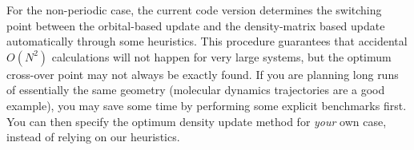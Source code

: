 For the non-periodic case, the current code version determines the
switching point between the orbital-based update and the
density-matrix based update automatically through some
heuristics. This procedure guarantees that accidental $O(N^2)$
calculations will not happen for very large systems, but the
optimum cross-over point may not always be exactly found. If you are
planning long runs of essentially the same geometry (molecular
dynamics trajectories are a good example), you may save some time by
performing some explicit benchmarks first. You can then specify the
optimum density update method for \emph{your} own case, instead of
relying on our heuristics.
